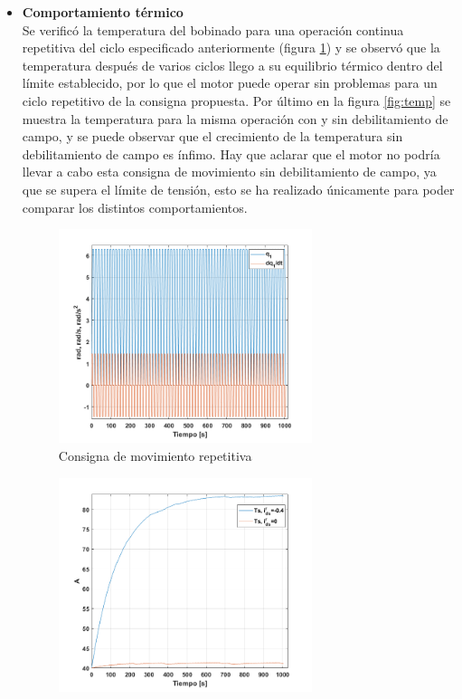 \documentclass[10pt]{article}
\begin{document}
\begin{itemize}
\item \textbf{Comportamiento térmico}\\
Se verificó la temperatura del bobinado para una operación continua repetitiva del ciclo especificado anteriormente (figura \ref{fig:rep}) y se observó que la temperatura después de varios ciclos llego a su equilibrio térmico dentro del límite establecido, por lo que el motor puede operar sin problemas para un ciclo repetitivo de la consigna propuesta. Por último en la figura \ref{fig:temp} se muestra la temperatura para la misma operación con y sin debilitamiento de campo, y se puede observar que el crecimiento de la temperatura
 sin debilitamiento de campo es ínfimo. Hay que aclarar que el motor no podría llevar a cabo esta consigna de movimiento sin debilitamiento de campo, ya que se supera el límite de tensión,
  esto se ha realizado únicamente para poder comparar los distintos comportamientos.
  \begin{figure}[h!]
	\centering
	\includegraphics[width=0.7\textwidth]{rep.png}
	\caption{\label{fig:rep}Consigna de movimiento repetitiva}
	\end{figure}
	\begin{figure}[h!]
		\centering
		\includegraphics[width=0.7\textwidth]{temp.png}

\end{figure}
\end{itemize}
\end{document}
